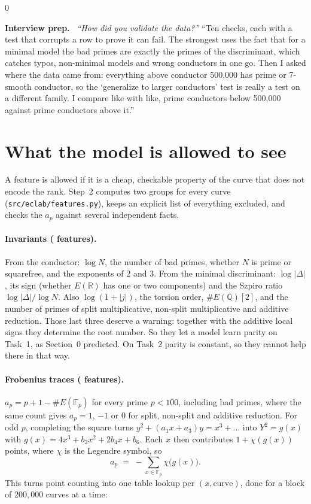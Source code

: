 \documentclass[11pt]{article}
\theoremstyle{definition}
\theoremstyle{plain}
\theoremstyle{remark}
\newcommand{\Q}{\mathbb{Q}}
\newcommand{\F}{\mathbb{F}}
\newcommand{\R}{\mathbb{R}}
\renewcommand{\_}{\oldunderscore\allowbreak}
\newcommand{\file}[1]{\textcolor{blue!50!black}{\texttt{#1}}}
\newenvironment{interview}
  {\par\medskip\noindent\begin{lrbox}{0}\begin{minipage}{\dimexpr\linewidth-2\fboxsep-2\fboxrule\relax}
   \textbf{Interview prep.}\ }
  {\end{minipage}\end{lrbox}\fcolorbox{blue!40!black}{interviewbg}{\usebox{0}}\par\medskip}
\begin{document}
\begin{interview}
\emph{``How did you validate the data?''} ``Ten checks, each with a test that corrupts a row
to prove it can fail. The strongest uses the fact that for a minimal model the bad primes are
exactly the primes of the discriminant, which catches typos, non-minimal models and wrong
conductors in one go. Then I asked where the data came from: everything above conductor
500{,}000 has prime or 7-smooth conductor, so the `generalize to larger conductors' test is
really a test on a different family. I compare like with like, prime conductors below
500{,}000 against prime conductors above it.''
\end{interview}

\section{What the model is allowed to see}
\label{sec:features}

A feature is allowed if it is a cheap, checkable property of the curve that does not encode
the rank. Step~2 computes two groups for every curve (\file{src/eclab/features.py}), keeps an
explicit list of everything excluded, and checks the $a_p$ against several independent facts.

\paragraph{Invariants (\NInvariantFeatures{} features).}
From the conductor: $\log N$, the number of bad primes, whether $N$ is prime or squarefree, and
the exponents of $2$ and $3$. From the minimal discriminant: $\log|\Delta|$, its sign (whether
$E(\R)$ has one or two components) and the Szpiro ratio $\log|\Delta|/\log N$. Also
$\log(1+|j|)$, the torsion order, $\#E(\Q)[2]$, and the number of primes of split
multiplicative, non-split multiplicative and additive reduction. Those last three deserve
a warning: together with the additive local signs they determine the root number. So they
let a model learn parity on Task~1, as Section~0 predicted. On Task~2 parity is constant,
so they cannot help there in that way.

\paragraph{Frobenius traces (\NApFeatures{} features).}
$a_p=p+1-\#E(\F_p)$ for every prime $p<100$, including bad primes, where the same count gives
$a_p=1$, $-1$ or $0$ for split, non-split and additive reduction. For odd $p$, completing the
square turns $y^2+(a_1x+a_3)y=x^3+\dots$ into $Y^2=g(x)$ with $g(x)=4x^3+b_2x^2+2b_4x+b_6$. Each
$x$ then contributes $1+\chi(g(x))$ points, where $\chi$ is the Legendre symbol, so
\[
  a_p\;=\;-\sum_{x\in\F_p}\chi\bigl(g(x)\bigr).
\]
This turns point counting into one table lookup per $(x,\text{curve})$, done for a block of
$200{,}000$ curves at a time:
\end{document}
